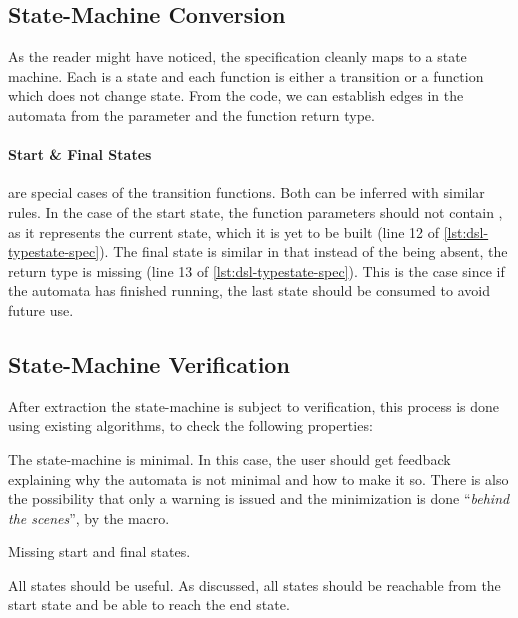 \subsection{State-Machine Conversion}
As the reader might have noticed, the specification cleanly maps to a state machine.
Each  is a state and each function is either a transition or a function which does not change state.
From the code, we can establish edges in the automata from the  parameter and the function return type.

\paragraph{Start \& Final States} are special cases of the transition functions.
Both can be inferred with similar rules. In the case of the start state, the function parameters should not contain ,
as it represents the current state, which it is yet to be built (line 12 of \autoref{lst:dsl-typestate-spec}).
The final state is similar in that instead of the  being absent, the return type is missing (line 13 of \autoref{lst:dsl-typestate-spec}).
This is the case since if the automata has finished running, the last state should be consumed to avoid future use.

\subsection{State-Machine Verification}\label{sec:arch:fsm-verification}
After extraction the state-machine is subject to verification,
this process is done using existing algorithms, to check the following properties:
\begin{compactitem}
    \item The state-machine is minimal. In this case, the user should get feedback explaining why the automata is not minimal and how to make it so.
    There is also the possibility that only a warning is issued and the minimization is done “\emph{behind the scenes}”, by the macro.
    \item Missing start and final states.
    \item All states should be useful. As discussed, all states should be reachable from the start state and be able to reach the end state.
\end{compactitem}

